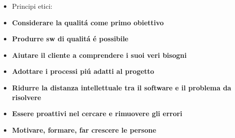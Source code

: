 \documentclass[a4paper,10pt] {article}
\begin{document}
\begin{itemize}
SWE != PROGRAMMING, la programmazione \'e solo un elemento, e anche il meno
importante. Il
programmatore deve fare solo quello che viene chiesto (da un membro del team
stesso). Il programmatore
deve obbedire, non pu\'o essere creativo.


\item Principi etici:
\item \textbf{Considerare la qualit\'a come primo obiettivo}
\item \textbf{Produrre sw di qualit\'a \'e possibile}
\item \textbf{Aiutare il cliente a comprendere i suoi veri bisogni}
\item \textbf{Adottare i processi pi\'u adatti al progetto}
\item \textbf{Ridurre la distanza intellettuale tra il software e il problema da
risolvere}
\item \textbf{Essere proattivi nel cercare e rimuovere gli errori}
\item \textbf{Motivare, formare, far crescere le persone}

\end {itemize}
\end{document}
